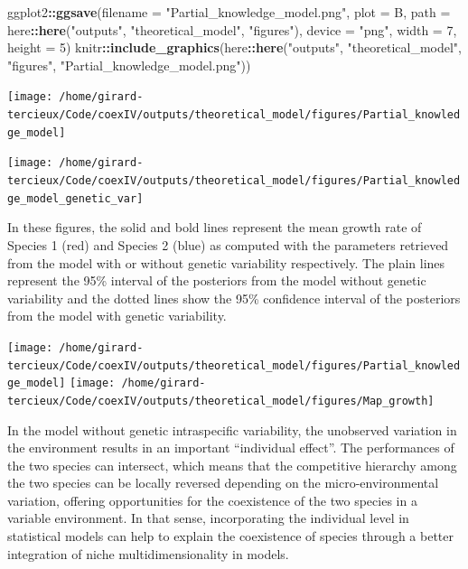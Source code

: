 \documentclass[
]{article}
\newenvironment{Shaded}{\begin{snugshade}}{\end{snugshade}}
\newcommand{\DataTypeTok}[1]{\textcolor[rgb]{0.13,0.29,0.53}{#1}}
\newcommand{\DecValTok}[1]{\textcolor[rgb]{0.00,0.00,0.81}{#1}}
\newcommand{\KeywordTok}[1]{\textcolor[rgb]{0.13,0.29,0.53}{\textbf{#1}}}
\newcommand{\NormalTok}[1]{#1}
\newcommand{\OperatorTok}[1]{\textcolor[rgb]{0.81,0.36,0.00}{\textbf{#1}}}
\newcommand{\StringTok}[1]{\textcolor[rgb]{0.31,0.60,0.02}{#1}}
\begin{document}
\begin{Shaded}
\begin{Highlighting}[]
\NormalTok{ggplot2}\OperatorTok{::}\KeywordTok{ggsave}\NormalTok{(}\DataTypeTok{filename =} \StringTok{"Partial_knowledge_model.png"}\NormalTok{, }\DataTypeTok{plot =}\NormalTok{ B, }
    \DataTypeTok{path =}\NormalTok{ here}\OperatorTok{::}\KeywordTok{here}\NormalTok{(}\StringTok{"outputs"}\NormalTok{, }\StringTok{"theoretical_model"}\NormalTok{, }\StringTok{"figures"}\NormalTok{), }
    \DataTypeTok{device =} \StringTok{"png"}\NormalTok{, }\DataTypeTok{width =} \DecValTok{7}\NormalTok{, }\DataTypeTok{height =} \DecValTok{5}\NormalTok{)}
\NormalTok{knitr}\OperatorTok{::}\KeywordTok{include_graphics}\NormalTok{(here}\OperatorTok{::}\KeywordTok{here}\NormalTok{(}\StringTok{"outputs"}\NormalTok{, }\StringTok{"theoretical_model"}\NormalTok{, }
    \StringTok{"figures"}\NormalTok{, }\StringTok{"Partial_knowledge_model.png"}\NormalTok{))}
\end{Highlighting}
\end{Shaded}

\texttt{[image: /home/girard-tercieux/Code/coexIV/outputs/theoretical\_model/figures/Partial\_knowledge\_model]}

\texttt{[image: /home/girard-tercieux/Code/coexIV/outputs/theoretical\_model/figures/Partial\_knowledge\_model\_genetic\_var]}

In these figures, the solid and bold lines represent the mean growth
rate of Species 1 (red) and Species 2 (blue) as computed with the
parameters retrieved from the model with or without genetic variability
respectively. The plain lines represent the 95\% interval of the
posteriors from the model without genetic variability and the dotted
lines show the 95\% confidence interval of the posteriors from the model
with genetic variability.

\texttt{[image: /home/girard-tercieux/Code/coexIV/outputs/theoretical\_model/figures/Partial\_knowledge\_model]}
\texttt{[image: /home/girard-tercieux/Code/coexIV/outputs/theoretical\_model/figures/Map\_growth]}

In the model without genetic intraspecific variability, the unobserved
variation in the environment results in an important ``individual
effect''. The performances of the two species can intersect, which means
that the competitive hierarchy among the two species can be locally
reversed depending on the micro-environmental variation, offering
opportunities for the coexistence of the two species in a variable
environment. In that sense, incorporating the individual level in
statistical models can help to explain the coexistence of species
through a better integration of niche multidimensionality in models.
\end{document}
